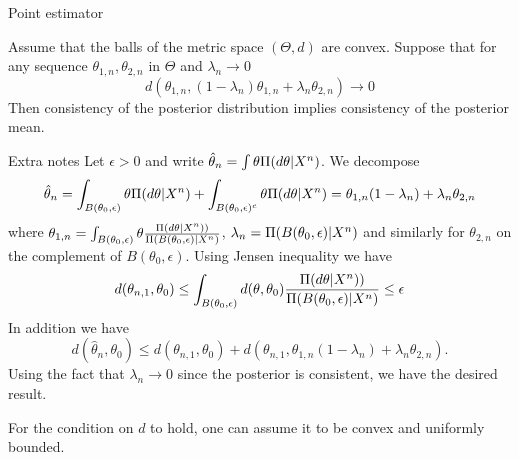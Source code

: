 \begin{frame}{Point estimator}
\begin{theorem}
Assume that the balls of the metric space $(\Theta,d)$ are convex. Suppose that for any sequence $\theta_{1,n}, \theta_{2,n}$ in $\Theta$ and $\lambda_n \to 0$
$$
d(\theta_{1,n}, (1-\lambda_n) \theta_{1,n} + \lambda_n \theta_{2,n}) \to 0 
$$
Then consistency of the posterior distribution implies consistency of the posterior mean. 
\end{theorem}

\end{frame}


\begin{frame}[allowframebreaks]{Extra notes}
	Let $\epsilon >0$ and write $\hat{\theta}_n = \int \theta \Pi(d\theta|X^n)$. We decompose 
	$$
\hat{\theta}_n = \int_{B(\theta_0,\epsilon)} \theta \Pi(d\theta|X^n) + \int_{B(\theta_0,\epsilon)^c} \theta \Pi(d\theta|X^n) = \theta_{1,n} (1-\lambda_n) + \lambda_n\theta_{2,n}
	$$
	where $\theta_{1,n} =\int_{B(\theta_0,\epsilon)} \theta \frac{\Pi(d\theta|X^n))}{\Pi(B(\theta_0,\epsilon)|X^n)} $, $\lambda_n = \Pi(B(\theta_0,\epsilon)|X^n)$ and similarly for $\theta_{2,n}$ on the complement of $B(\theta_0,\epsilon)$.
	Using Jensen inequality we have 
	\begin{equation*}
	d(\theta_{n,1},\theta_0) \leq \int_{B(\theta_0,\epsilon)} d(\theta,\theta_0) \frac{\Pi(d\theta|X^n))}{\Pi(B(\theta_0,\epsilon)|X^n)} \leq \epsilon
	\end{equation*}
	In addition we have 
	$$
	d(\hat{\theta}_n,\theta_0) \leq d(\theta_{n,1},\theta_0) + d(\theta_{n,1}, \theta_{1,n} (1-\lambda_n) + \lambda_n\theta_{2,n} ).
	$$
	Using the fact that $\lambda_n \to 0$ since the posterior is consistent, we have the desired result. 
	\begin{remark}
	For the condition on $d$ to hold, one can assume it to be convex and uniformly bounded. 
	\end{remark}
\end{frame}

